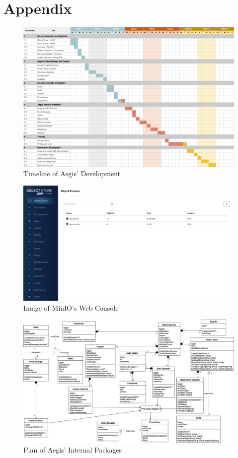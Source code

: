 \documentclass[12pt, conference, final, a4paper, onecolumn, compsoc]{IEEEtran}
\begin{document}
\section{Appendix}

\begin{figure}[H]
  \centering \includegraphics[scale=.65]{diagrams/gantt-chart.png}
  \caption{Timeline of Aegis' Development}
  \label{appendix:gantt}
\end{figure}

\begin{figure}[H]
  \centering \includegraphics[scale=.3]{images/minio-console.png}
  \caption{Image of MinIO's Web Console}
  \label{appendix:minio-console}
\end{figure}

\begin{figure}[H]
  \centering \includegraphics[scale=.38]{diagrams/class-diagram.png}
  \caption{Plan of Aegis' Internal Packages}
  \label{appendix:class-diagram}
\end{figure}
\end{document}
